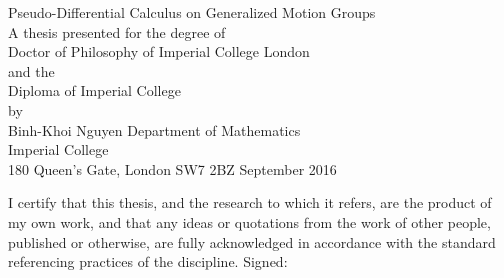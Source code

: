 \begin{titlepage}
\begin{center}
\null\vfill
{\LARGE{Pseudo-Differential Calculus on Generalized Motion Groups}}
\\
\vfill
{\footnotesize
{A thesis presented for the degree of}\\
Doctor of Philosophy of Imperial College London\\
{and the}\\
Diploma of Imperial College\\
{by} \\
}
{\large{Binh-Khoi Nguyen}}
\vfill\vfill\vfill
{\footnotesize{
Department of Mathematics\\
Imperial College \\
180 Queen's Gate, London SW7 2BZ}
\vfill
{{September 2016}}
}
\end{center}
\end{titlepage}

\newpage
\hphantom{1}
\vfill
\noindent I certify that this thesis, and the research to which it refers,
are the product of my own work, and that any ideas or quotations from the
work of other people, published or otherwise, are fully acknowledged in accordance
with the standard referencing practices of the discipline.
\vfill
{\hfill Signed: \hrulefill}
\vfill

